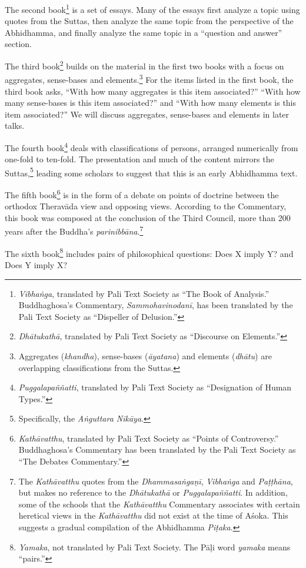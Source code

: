 The second book\footnote{\textit{Vibhaṅga}, translated by Pali Text Society as “The Book of Analysis.” Buddhaghosa’s Commentary, \textit{Sammohavinodanī}, has been translated by the Pali Text Society as “Dispeller of Delusion.”} is a set of essays. Many of the essays first analyze a topic using quotes from the Suttas, then analyze the same topic from the perspective of the Abhidhamma, and finally analyze the same topic in a “question and answer” section.

The third book\footnote{\textit{Dhātukathā}, translated by Pali Text Society as “Discourse on Elements.”} builds on the material in the first two books with a focus on aggregates, sense-bases and elements.\footnote{Aggregates (\textit{khandha}), sense-bases (\textit{āyatana}) and elements (\textit{dhātu}) are overlapping classifications from the Suttas.} For the items listed in the first book, the third book asks, “With how many aggregates is this item associated?” “With how many sense-bases is this item associated?” and “With how many elements is this item associated?” We will discuss aggregates, sense-bases and elements in later talks.

The fourth book\footnote{\textit{Puggalapaññatti}, translated by Pali Text Society as “Designation of Human Types.”} deals with classifications of persons, arranged numerically from one-fold to ten-fold. The presentation and much of the content mirrors the Suttas,\footnote{Specifically, the \textit{Aṅguttara Nikāya}.} leading some scholars to suggest that this is an early Abhidhamma text.

The fifth book\footnote{\textit{Kathāvatthu}, translated by Pali Text Society as “Points of Controversy.” Buddhaghosa’s Commentary has been translated by the Pali Text Society as “The Debates Commentary.”} is in the form of a debate on points of doctrine between the orthodox Theravāda view and opposing views. According to the Commentary, this book was composed at the conclusion of the Third Council, more than 200 years after the Buddha’s \textit{parinibbāna}.\footnote{The \textit{Kathāvatthu} quotes from the \textit{Dhammasaṅgaṇī}, \textit{Vibhaṅga} and \textit{Paṭṭhāna}, but makes no reference to the \textit{Dhātukathā} or \textit{Puggalapaññatti}. In addition, some of the schools that the \textit{Kathāvatthu} Commentary associates with certain heretical views in the \textit{Kathāvatthu} did not exist at the time of Aśoka. This suggests a gradual compilation of the Abhidhamma \textit{Piṭaka}.}

The sixth book\footnote{\textit{Yamaka}, not translated by Pali Text Society. The Pāḷi word \textit{yamaka} means “pairs.”} includes pairs of philosophical questions: Does X imply Y? and Does Y imply X?

